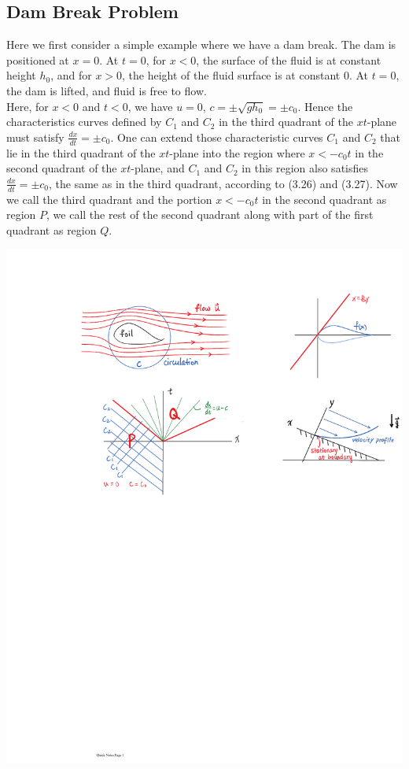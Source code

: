 \documentclass[11pt]{book}
\theoremstyle{break}
\theoremstyle{break}
\begin{document}
\subsection*{Dam Break Problem}
Here we first consider a simple example where we have a dam break. The dam is positioned at $x=0$. At $t=0$, for $x<0$, the surface of the fluid is at constant height $h_0$, and for $x>0$, the height of the fluid surface is at constant $0$. At $t=0$, the dam is lifted, and fluid is free to flow. \\


Here, for $x<0$ and $t<0$, we have $u=0$, $c = \pm\sqrt{gh_0} = \pm c_0$. Hence the characteristics curves defined by $C_1$ and $C_2$ in the third quadrant of the $xt$-plane must satisfy $\frac{dx}{dt} = \pm c_0$. One can extend those characteristic curves $C_1$ and $C_2$ that lie in the third quadrant of the $xt$-plane into the region where $x < -c_0 t$ in the second quadrant of the $xt$-plane, and $C_1$ and $C_2$ in this region also satisfies $\frac{dx}{dt} = \pm c_0$, the same as in the third quadrant, according to (3.26) and (3.27). Now we call the third quadrant and the portion $x<-c_0 t$ in the second quadrant as region $P$, we call the rest of the second quadrant along with part of the first quadrant as region $Q$. 
\begin{center}
\includegraphics[scale=1.19]{QP.pdf}
\end{center}
\end{document}
